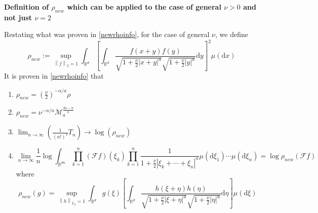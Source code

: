 \documentclass[a4paper,11pt]{article}
\numberwithin{equation}{section}
\theoremstyle{plain}
\theoremstyle{definition}
\newcommand{\ud}{\ensuremath{\mathrm{d} }}
\newcommand{\Norm}[1]{\left\|  #1   \right\|}
\newcommand{\R}{\mathbb{R}}
\numberwithin{NQ}{section}
\numberwithin{LQ}{section}
\numberwithin{ZQ}{section}
\begin{document}
	\noindent\textbf{Definition of $\rho_{new}$ which can be applied to the case of general $\nu >0$ and not just $\nu = 2$}

	Restating what was proven in \ref{newrhoinfo}, for the case of general $\nu$, we define
	\[
	\rho_{new} :=  \sup_{\Norm{f}_2 =1} \int_{\R^d} \left[ \int_{\R^d} \frac{f(x+y)f(y)}{\sqrt{1+\frac{\nu}{2}|x+y|^a } \sqrt{1+\frac{\nu}{2}|y|^a} } \ud y \right]^2 \mu(\ud x)
	\]
	It is proven in \ref{newrhoinfo} that
	\begin{enumerate}
		\item $\rho_{new} = \left( \frac{\nu}{2}\right)^{-\alpha/a}\rho $
		\item $\rho_{new} = \nu^{-\alpha/a} \mathcal{M}_a^{\frac{2a-\alpha}{a}}$
		\item $\lim_{n \to \infty} \left( \frac{1}{(n!)^2}T_n\right) \to \log(\rho_{new})$
		\item
		\[
		\lim_{n\to \infty}\frac{1}{n} \log \int_{\R^{dn}} \prod_{k=1}^n(\mathcal{F}f)(\xi_k) \prod_{k=1}^n\frac{1}{1+\frac{\nu}{2}|\xi_k+\cdots+\xi_n|^a} \mu(\ud \xi_1) \cdots \mu(\ud \xi_n) = \log \rho_{new}(\mathcal{F}f)
		\]
		where
		\[
		\rho_{new}(g) = \sup_{\Norm{h}_{L_2}=1} \int_{\R^d}g(\xi)\left[ \int_{\R^d} \frac{h(\xi + \eta)h(\eta)}{\sqrt{1+\frac{\nu}{2}|\xi+\eta|^a}\sqrt{1+\frac{\nu}{2}|\eta|^a}}  \ud \eta\right] \mu(\ud \xi)
		\]
	\end{enumerate}
\end{document}
